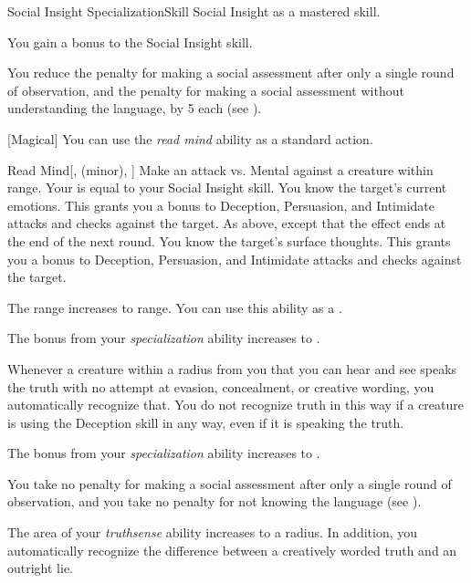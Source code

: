     \begin{feat}{Social Insight Specialization}{Skill}
        \featpre Social Insight as a mastered skill.

         You gain a  bonus to the Social Insight skill.

         You reduce the penalty for making a social assessment after only a single round of observation, and the penalty for making a social assessment without understanding the language, by 5 each (see ).

        [Magical] You can use the \textit{read mind} ability as a standard action.
        \begin{freeability}{Read Mind}[,  (minor), ]
            Make an attack vs. Mental against a creature within \rngshort range.
            Your  is equal to your Social Insight skill.
            \hit You know the target's current emotions.
            This grants you a  bonus to Deception, Persuasion, and Intimidate attacks and checks against the target.
            \glance As above, except that the effect ends at the end of the next round.
            \crit You know the target's surface thoughts.
            This grants you a  bonus to Deception, Persuasion, and Intimidate attacks and checks against the target.

            \rankline
             The range increases to \rnglong range.
             You can use this ability as a .
        \end{freeability}

         The bonus from your \textit{specialization} ability increases to .

         Whenever a creature within a \arealarge radius  from you that you can hear and see speaks the truth with no attempt at evasion, concealment, or creative wording, you automatically recognize that.
        You do not recognize truth in this way if a creature is using the Deception skill in any way, even if it is speaking the truth.

         The bonus from your \textit{specialization} ability increases to .

         You take no penalty for making a social assessment after only a single round of observation, and you take no penalty for not knowing the language (see ).

         The area of your \textit{truthsense} ability increases to a \gargarea radius.
        In addition, you automatically recognize the difference between a creatively worded truth and an outright lie.
    \end{feat}

